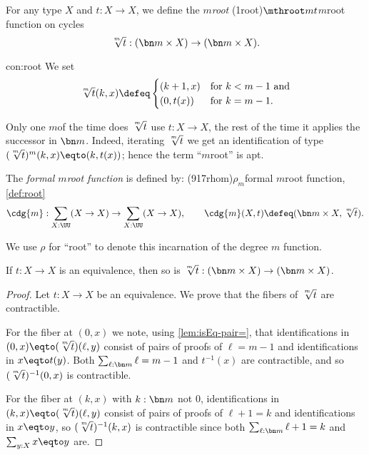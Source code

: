 \begin{construction}\label{con:root}
  For any type $X$ and $t:X\to X$, we define the $m$\th \emph{root}%
  \glossary(1root){$\protect\mthroot mt$}{$m$\th root function on cycles}
 \[
    {\textstyle\sqrt[\uproot{2}m]t} : (\bn m\times X) \to (\bn m\times X).
  \]
\end{construction}
\begin{implementation}{con:root}
  We set
  \[
    {\textstyle\sqrt[\uproot{2}m]t}(k,x)\defeq
    \begin{cases}
      (k+1,x)& \text{for $k<m-1$ and}\\
      (0,t(x))& \text{for $k=m-1$}.
    \end{cases}
  \]
\par \vspace{-1.5\baselineskip}
\qedhere
\end{implementation}
Only one $m$\th of the time does $\sqrt[\uproot{2}m]t$ use $t:X\to X$,
the rest of the time it applies the successor in $\bn m$.
Indeed, iterating $\sqrt[\uproot{2}m]t$
we get an identification of type $(\sqrt[\uproot{2}m]t)^m(k,x)\eqto(k,t(x))$;
hence the term ``$m$\th root'' is apt.

\begin{definition}\label{def:root}
  The \emph{formal $m$\th root function} is defined by:
  \glossary(917rhom){$\rho_m$}{formal $m$\th root function, \cref{def:root}}
  \[
    \cdg{m}:\sum_{X:\UU}(X\to X)\to\sum_{X:\UU}(X\to X),\qquad
    \cdg{m}(X,t)\defeq(\bn m\times X,{\textstyle\sqrt[\uproot{2}m]t}).\qedhere
  \]
\end{definition}
\noindent We use $\rho$ for ``root'' to denote this incarnation
of the degree $m$ function.

\begin{lemma}\label{lem:root-pres-equiv}
  If $t:X\to X$ is an equivalence,
  then so is $\sqrt[\uproot{2}m]t : (\bn m\times X) \to (\bn m\times X)$.
\end{lemma}
\begin{proof}
  Let $t:X\to X$ be an equivalence. We prove that the fibers of 
  $\sqrt[\uproot{2}m]t$ are contractible.
  
  For the fiber at $(0,x)$ we note,
  using \cref{lem:isEq-pair=}, that identifications in 
  $(0,x)\eqto(\sqrt[\uproot{2}m]t)(\ell,y)$ consist of pairs of proofs 
  of  $\ell=m-1$ and identifications in $x\eqto t(y)$. 
  Both $\sum_{\ell:\bn m}\ell=m-1$ and $t^{-1}(x)$ are contractible,
  and so $(\sqrt[\uproot{2}m]t)^{-1}(0,x)$ is contractible.

  For the fiber at $(k,x)$ with $k:\bn m$ not $0$,
  identifications in $(k,x)\eqto(\sqrt[\uproot{2}m]t)(\ell,y)$
  consist of pairs of proofs of $\ell+1=k$ and identifications in $x\eqto y$,
  so $(\sqrt[\uproot{2}m]t)^{-1}(k,x)$ is contractible since both
  $\sum_{\ell:\bn m}\ell+1=k$ and $\sum_{y:X}x\eqto y$ are.
\end{proof}

